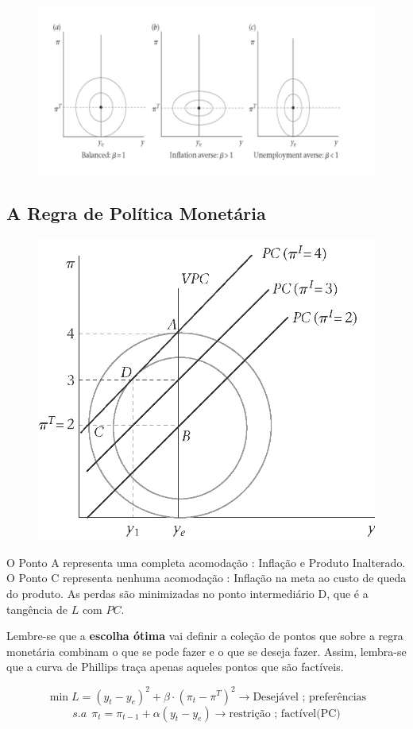 \documentclass[a4paper,12pt]{article}[abntex2]
\begin{document}
\begin{figure}[H]
    \centering
    \includegraphics[width=0.7\linewidth]{Imagens/a14i5.png}
\end{figure}

\subsection{\textbf{A Regra de Política Monetária}}
\begin{figure}[H]
    \centering
    \includegraphics[width=0.7\linewidth]{Imagens/a15i1.png}
\end{figure}

O Ponto A representa uma completa acomodação : Inflação e Produto Inalterado. O Ponto C representa nenhuma acomodação : Inflação na meta ao custo de queda do produto. As perdas são minimizadas no ponto intermediário D, que é a tangência de \(L\) com \(PC\).

Lembre-se que a \textbf{escolha ótima} vai definir a coleção de pontos que sobre a regra monetária combinam o que se pode fazer e o que se deseja fazer. Assim, lembra-se que a curva de Phillips traça apenas aqueles pontos que são factíveis.

\[
\min L = (y_t - y_e)^2 + \beta \cdot (\pi_t - \pi^T)^2 \rightarrow \text{Desejável ; preferências}
\]
\[
s.a \ \ \pi_t=\pi_{t-1}+\alpha(y_t-y_e) \rightarrow \text{restrição ;  factível(PC)}
\]
\end{document}
